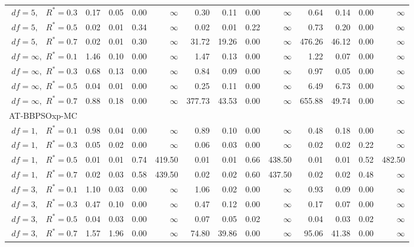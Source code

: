 \documentclass[12pt]{article}
\begin{document}
\begin{table}[ht]
{\begin{tabular}{r|rrrr|rrrr|rrrr}
  $df = 5,\enspace$ $R^* =0.3$ & 0.17 & 0.05 & 0.00 & $\infty$ & 0.30 & 0.11 & 0.00 & $\infty$ & 0.64 & 0.14 & 0.00 & $\infty$ \\ 
  $df = 5,\enspace$ $R^* =0.5$ & 0.02 & 0.01 & 0.34 & $\infty$ & 0.02 & 0.01 & 0.22 & $\infty$ & 0.73 & 0.20 & 0.00 & $\infty$ \\ 
  $df = 5,\enspace$ $R^* =0.7$ & 0.02 & 0.01 & 0.30 & $\infty$ & 31.72 & 19.26 & 0.00 & $\infty$ & 476.26 & 46.12 & 0.00 & $\infty$ \\ 
  $df = \infty,$ $R^* =0.1$ & 1.46 & 0.10 & 0.00 & $\infty$ & 1.47 & 0.13 & 0.00 & $\infty$ & 1.22 & 0.07 & 0.00 & $\infty$ \\ 
  $df = \infty,$ $R^* =0.3$ & 0.68 & 0.13 & 0.00 & $\infty$ & 0.84 & 0.09 & 0.00 & $\infty$ & 0.97 & 0.05 & 0.00 & $\infty$ \\ 
  $df = \infty,$ $R^* =0.5$ & 0.04 & 0.01 & 0.00 & $\infty$ & 0.25 & 0.11 & 0.00 & $\infty$ & 6.49 & 6.73 & 0.00 & $\infty$ \\ 
  $df = \infty,$ $R^* =0.7$ & 0.88 & 0.18 & 0.00 & $\infty$ & 377.73 & 43.53 & 0.00 & $\infty$ & 655.88 & 49.74 & 0.00 & $\infty$ \\ 
\hline
\multicolumn{1}{l|}{AT-BBPSOxp-MC} &&&&&&&&&&&&\\
  $df = 1,\enspace$ $R^* =0.1$ & 0.98 & 0.04 & 0.00 & $\infty$ & 0.89 & 0.10 & 0.00 & $\infty$ & 0.48 & 0.18 & 0.00 & $\infty$ \\ 
  $df = 1,\enspace$ $R^* =0.3$ & 0.05 & 0.02 & 0.00 & $\infty$ & 0.06 & 0.03 & 0.00 & $\infty$ & 0.02 & 0.02 & 0.22 & $\infty$ \\ 
  $df = 1,\enspace$ $R^* =0.5$ & 0.01 & 0.01 & 0.74 & 419.50 & 0.01 & 0.01 & 0.66 & 438.50 & 0.01 & 0.01 & 0.52 & 482.50 \\ 
  $df = 1,\enspace$ $R^* =0.7$ & 0.02 & 0.03 & 0.58 & 439.50 & 0.02 & 0.02 & 0.60 & 437.50 & 0.02 & 0.02 & 0.48 & $\infty$ \\ 
  $df = 3,\enspace$ $R^* =0.1$ & 1.10 & 0.03 & 0.00 & $\infty$ & 1.06 & 0.02 & 0.00 & $\infty$ & 0.93 & 0.09 & 0.00 & $\infty$ \\ 
  $df = 3,\enspace$ $R^* =0.3$ & 0.47 & 0.10 & 0.00 & $\infty$ & 0.47 & 0.12 & 0.00 & $\infty$ & 0.17 & 0.07 & 0.00 & $\infty$ \\ 
  $df = 3,\enspace$ $R^* =0.5$ & 0.04 & 0.03 & 0.00 & $\infty$ & 0.07 & 0.05 & 0.02 & $\infty$ & 0.04 & 0.03 & 0.02 & $\infty$ \\ 
  $df = 3,\enspace$ $R^* =0.7$ & 1.57 & 1.96 & 0.00 & $\infty$ & 74.80 & 39.86 & 0.00 & $\infty$ & 95.06 & 41.38 & 0.00 & $\infty$ \\ 

\end{tabular}}
\end{table}
\end{document}
